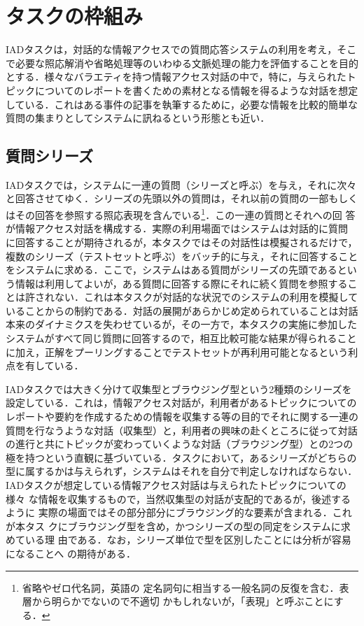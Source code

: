 \documentclass[japanese]{jnlp_1.4}
\begin{document}
\section{タスクの枠組み} \label{Sec2}

IADタスクは，対話的な情報アクセスでの質問応答システムの利用を考え，そこ
で必要な照応解消や省略処理等のいわゆる文脈処理の能力を評価することを目的
とする．様々なバラエティを持つ情報アクセス対話の中で，特に，与えられたト
ピックについてのレポートを書くための素材となる情報を得るような対話を想定
している．これはある事件の記事を執筆するために，必要な情報を比較的簡単な
質問の集まりとしてシステムに訊ねるという形態とも近い．

\subsection{質問シリーズ}

IADタスクでは，システムに一連の質問（シリーズと呼ぶ）を与え，それに次々
と回答させてゆく．シリーズの先頭以外の質問は，それ以前の質問の一部もしく
はその回答を参照する照応表現を含んでいる\footnote{
	省略やゼロ代名詞，英語の
	定名詞句に相当する一般名詞の反復を含む．表層から明らかでないので不適切
	かもしれないが，「表現」と呼ぶことにする．
}．この一連の質問とそれへの回
答が情報アクセス対話を構成する．実際の利用場面ではシステムは対話的に質問
に回答することが期待されるが，本タスクではその対話性は模擬されるだけで，
複数のシリーズ（テストセットと呼ぶ）をバッチ的に与え，それに回答すること
をシステムに求める．ここで，システムはある質問がシリーズの先頭であるとい
う情報は利用してよいが，ある質問に回答する際にそれに続く質問を参照するこ
とは許されない．これは本タスクが対話的な状況でのシステムの利用を模擬して
いることからの制約である．対話の展開があらかじめ定められていることは対話
本来のダイナミクスを失わせているが，その一方で，本タスクの実施に参加した
システムがすべて同じ質問に回答するので，相互比較可能な結果が得られること
に加え，正解をプーリングすることでテストセットが再利用可能となるという利
点を有している．

IADタスクでは大きく分けて収集型とブラウジング型という2種類のシリーズを
設定している．これは，情報アクセス対話が，利用者があるトピックについての
レポートや要約を作成するための情報を収集する等の目的でそれに関する一連の
質問を行なうような対話（収集型）と，利用者の興味の赴くところに従って対話
の進行と共にトピックが変わっていくような対話（ブラウジング型）との2つの
極を持つという直観に基づいている．タスクにおいて，あるシリーズがどちらの
型に属するかは与えられず，システムはそれを自分で判定しなければならない．
IADタスクが想定している情報アクセス対話は与えられたトピックについての様々
な情報を収集するもので，当然収集型の対話が支配的であるが，後述するように
実際の場面ではその部分部分にブラウジング的な要素が含まれる．これが本タス
クにブラウジング型を含め，かつシリーズの型の同定をシステムに求めている理
由である．なお，シリーズ単位で型を区別したことには分析が容易になることへ
の期待がある．
\end{document}
